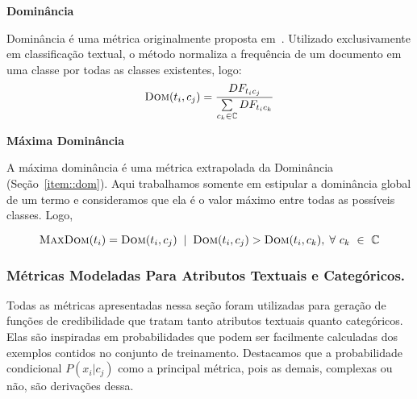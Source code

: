 \begin{description}
\item{\textbf{Dominância}}
\label{item::dom}

Dominância é uma métrica originalmente proposta em~\cite{Zaiane02}.
Utilizado exclusivamente em classificação textual, o método normaliza a frequência de um documento em uma classe por todas as classes existentes, logo:
\begin{equation}\label{eqn::dom}
 \textsc{Dom}(t_i, c_j) = \frac{ DF_{t_ic_j} } { \sum\limits_{c_k \in \mathbb{C}} DF_{t_ic_k} } 
\end{equation}


\item{\textbf{Máxima Dominância}}
\label{item::maxdom}

A máxima dominância é uma métrica extrapolada da Dominância (Seção~\ref{item::dom}). Aqui trabalhamos somente em estipular a dominância global de um termo e consideramos que ela é o valor máximo entre todas as possíveis classes. Logo,

\begin{equation}\label{eqn::maxdom}
 \textsc{MaxDom}(t_i) = \textsc{Dom}(t_i,c_j) \; \; | \;\; \textsc{Dom}(t_i, c_j) > \textsc{Dom}(t_i, c_k), \; \forall\ c_k\ \in\ \mathbb{C}
\end{equation}

\end{description}

%

\subsubsection{Métricas Modeladas Para Atributos Textuais e Categóricos.}
\label{subsec::pg_metricas_conteudo}


Todas as métricas apresentadas nessa seção foram utilizadas para geração de funções de credibilidade que tratam tanto atributos textuais quanto categóricos. 
Elas são inspiradas em probabilidades que podem ser facilmente calculadas dos exemplos contidos no conjunto de treinamento. 
Destacamos que a probabilidade condicional $P(x_i|c_j)$ como a principal métrica, pois as demais, complexas ou não, são derivações dessa.


